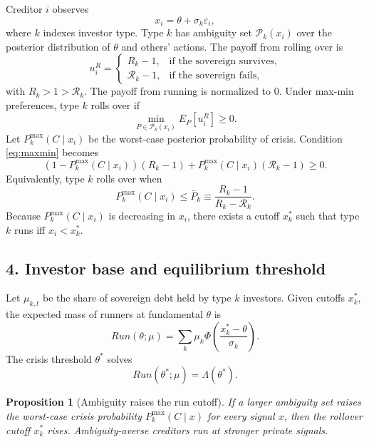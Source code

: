 \documentclass[11pt]{article}
\newtheorem{proposition}{Proposition}
\begin{document}
Creditor $i$ observes
\begin{equation}
x_i=\theta+\sigma_k \varepsilon_i,
\end{equation}
where $k$ indexes investor type. Type $k$ has ambiguity set $\mathcal P_k(x_i)$ over the posterior distribution of $\theta$ and others' actions. The payoff from rolling over is
\begin{equation}
u^R_i=\begin{cases}
R_k-1, & \text{if the sovereign survives},\\
\mathcal R_k-1, & \text{if the sovereign fails},
\end{cases}
\end{equation}
with $R_k>1>\mathcal R_k$. The payoff from running is normalized to $0$. Under max-min preferences, type $k$ rolls over if
\begin{equation}
\min_{P\in\mathcal P_k(x_i)} E_P[u^R_i]\geq 0. \label{eq:maxmin}
\end{equation}
Let $P_k^{\max}(C\mid x_i)$ be the worst-case posterior probability of crisis. Condition \eqref{eq:maxmin} becomes
\begin{equation}
(1-P_k^{\max}(C\mid x_i))(R_k-1)+P_k^{\max}(C\mid x_i)(\mathcal R_k-1)\geq 0. \label{eq:rollover-condition}
\end{equation}
Equivalently, type $k$ rolls over when
\begin{equation}
P_k^{\max}(C\mid x_i)\leq \bar P_k\equiv \frac{R_k-1}{R_k-\mathcal R_k}. \label{eq:thresholdprob}
\end{equation}
Because $P_k^{\max}(C\mid x_i)$ is decreasing in $x_i$, there exists a cutoff $x_k^*$ such that type $k$ runs iff $x_i<x_k^*$.

\subsection*{4. Investor base and equilibrium threshold}
Let $\mu_{k,t}$ be the share of sovereign debt held by type $k$ investors. Given cutoffs $x_k^*$, the expected mass of runners at fundamental $\theta$ is
\begin{equation}
Run(\theta;\mu)=\sum_k \mu_k \Phi\left(\frac{x_k^*-\theta}{\sigma_k}\right). \label{eq:aggregate-run}
\end{equation}
The crisis threshold $\theta^*$ solves
\begin{equation}
Run(\theta^*;\mu)=\Lambda(\theta^*). \label{eq:crisis-threshold}
\end{equation}

\begin{proposition}[Ambiguity raises the run cutoff]
If a larger ambiguity set raises the worst-case crisis probability $P_k^{\max}(C\mid x)$ for every signal $x$, then the rollover cutoff $x_k^*$ rises. Ambiguity-averse creditors run at stronger private signals.
\end{proposition}
\end{document}

